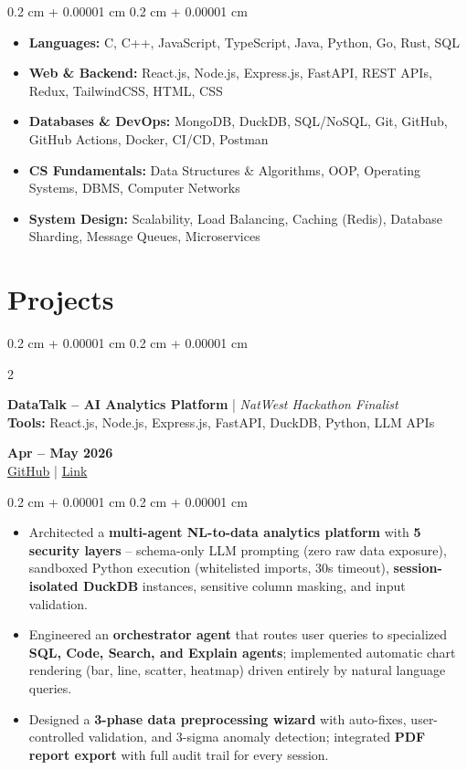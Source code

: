 \documentclass[10pt, letterpaper]{article}
\newenvironment{highlights}{
    \begin{itemize}[
        topsep=0.05 cm,
        parsep=0.05 cm,
        partopsep=0pt,
        itemsep=0pt,
        leftmargin=0.4 cm + 10pt
    ]
}{
    \end{itemize}
} %
\newenvironment{highlightsforbulletentries}{
    \begin{itemize}[
        topsep=0.05 cm,
        parsep=0.05 cm,
        partopsep=0pt,
        itemsep=0pt,
        leftmargin=10pt
    ]
}{
    \end{itemize}
} %
\newenvironment{onecolentry}{
    \begin{adjustwidth}{
        0.2 cm + 0.00001 cm
    }{
        0.2 cm + 0.00001 cm
    }
}{
    \end{adjustwidth}
} %
\newenvironment{twocolentry}[2][]{
    \onecolentry
    \def\secondColumn{#2}
    \setcolumnwidth{\fill, 4.5 cm}
    \begin{paracol}{2}
}{
    \switchcolumn \raggedleft \secondColumn
    \end{paracol}
    \endonecolentry
} %
\let\hrefWithoutArrow\href
\renewcommand{\href}[2]{\hrefWithoutArrow{#1}{\ifthenelse{\equal{#2}{}}{ }{#2 }\raisebox{.15ex}{\footnotesize \faExternalLink*}}}
\begin{document}
\begin{onecolentry}
    \begin{highlightsforbulletentries}
        \item \textbf{Languages:} C, C++, JavaScript, TypeScript, Java, Python, Go, Rust, SQL
        \item \textbf{Web \& Backend:} React.js, Node.js, Express.js, FastAPI, REST APIs, Redux, TailwindCSS, HTML, CSS
        \item \textbf{Databases \& DevOps:} MongoDB, DuckDB, SQL/NoSQL, Git, GitHub, GitHub Actions, Docker, CI/CD, Postman
        \item \textbf{CS Fundamentals:} Data Structures \& Algorithms, OOP, Operating Systems, DBMS, Computer Networks
        \item \textbf{System Design:} Scalability, Load Balancing, Caching (Redis), Database Sharding, Message Queues, Microservices
    \end{highlightsforbulletentries}
\end{onecolentry}


\section{Projects}
\vspace{0.02 cm}

\begin{twocolentry}{
    \textbf{Apr -- May 2026} \\
\hrefWithoutArrow{https://github.com/Gagan202005/Natwest-Hackathon}{GitHub} |
\hrefWithoutArrow{https://datatalk-wine.vercel.app/}{Link}
}
\textbf{DataTalk -- AI Analytics Platform} | \textit{NatWest Hackathon Finalist} \\
\textbf{Tools:} React.js, Node.js, Express.js, FastAPI, DuckDB, Python, LLM APIs
\end{twocolentry}

\begin{onecolentry}
\begin{highlights}
\item Architected a \textbf{multi-agent NL-to-data analytics platform} with \textbf{5 security layers} -- schema-only LLM prompting (zero raw data exposure), sandboxed Python execution (whitelisted imports, 30s timeout), \textbf{session-isolated DuckDB} instances, sensitive column masking, and input validation.
\item Engineered an \textbf{orchestrator agent} that routes user queries to specialized \textbf{SQL, Code, Search, and Explain agents}; implemented automatic chart rendering (bar, line, scatter, heatmap) driven entirely by natural language queries.
\item Designed a \textbf{3-phase data preprocessing wizard} with auto-fixes, user-controlled validation, and 3-sigma anomaly detection; integrated \textbf{PDF report export} with full audit trail for every session.
\end{highlights}
\end{onecolentry}
\end{document}
